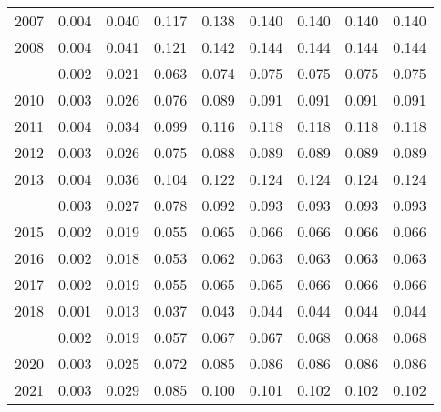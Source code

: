 \documentclass[
]{article}
\begin{document}
\begin{longtable}[t]{lrrrrrrrr}
2007 & 0.004 & 0.040 & 0.117 & 0.138 & 0.140 & 0.140 & 0.140 & 0.140\\
2008 & 0.004 & 0.041 & 0.121 & 0.142 & 0.144 & 0.144 & 0.144 & 0.144\\
\addlinespace
2009 & 0.002 & 0.021 & 0.063 & 0.074 & 0.075 & 0.075 & 0.075 & 0.075\\
2010 & 0.003 & 0.026 & 0.076 & 0.089 & 0.091 & 0.091 & 0.091 & 0.091\\
2011 & 0.004 & 0.034 & 0.099 & 0.116 & 0.118 & 0.118 & 0.118 & 0.118\\
2012 & 0.003 & 0.026 & 0.075 & 0.088 & 0.089 & 0.089 & 0.089 & 0.089\\
2013 & 0.004 & 0.036 & 0.104 & 0.122 & 0.124 & 0.124 & 0.124 & 0.124\\
\addlinespace
2014 & 0.003 & 0.027 & 0.078 & 0.092 & 0.093 & 0.093 & 0.093 & 0.093\\
2015 & 0.002 & 0.019 & 0.055 & 0.065 & 0.066 & 0.066 & 0.066 & 0.066\\
2016 & 0.002 & 0.018 & 0.053 & 0.062 & 0.063 & 0.063 & 0.063 & 0.063\\
2017 & 0.002 & 0.019 & 0.055 & 0.065 & 0.065 & 0.066 & 0.066 & 0.066\\
2018 & 0.001 & 0.013 & 0.037 & 0.043 & 0.044 & 0.044 & 0.044 & 0.044\\
\addlinespace
2019 & 0.002 & 0.019 & 0.057 & 0.067 & 0.067 & 0.068 & 0.068 & 0.068\\
2020 & 0.003 & 0.025 & 0.072 & 0.085 & 0.086 & 0.086 & 0.086 & 0.086\\
2021 & 0.003 & 0.029 & 0.085 & 0.100 & 0.101 & 0.102 & 0.102 & 0.102\\*
\end{longtable}
\end{document}
